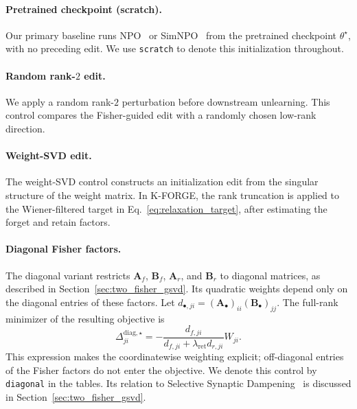 \documentclass[11pt]{article}
\begin{document}
\paragraph{Pretrained checkpoint (scratch).}
Our primary baseline runs NPO~\citep{npo} or SimNPO~\citep{simnpo} from the pretrained checkpoint $\theta^\star$, with no preceding edit.
We use \texttt{scratch} to denote this initialization throughout.

\paragraph{Random rank-$2$ edit.}
We apply a random rank-$2$ perturbation before downstream unlearning.
This control compares the Fisher-guided edit with a randomly chosen low-rank direction.

\paragraph{Weight-SVD edit.}
The weight-SVD control constructs an initialization edit from the singular structure of the weight matrix.
In K-FORGE, the rank truncation is applied to the Wiener-filtered target in Eq.~\ref{eq:relaxation_target}, after estimating the forget and retain factors.

\paragraph{Diagonal Fisher factors.}
The diagonal variant restricts $\mathbf{A}_f$, $\mathbf{B}_f$, $\mathbf{A}_r$, and $\mathbf{B}_r$ to diagonal matrices, as described in Section~\ref{sec:two_fisher_gsvd}.
Its quadratic weights depend only on the diagonal entries of these factors.
Let
$d_{\bullet,ji}=(\mathbf{A}_{\bullet})_{ii}(\mathbf{B}_{\bullet})_{jj}$.
The full-rank minimizer of the resulting objective is
\begin{equation}
    \Delta^{\mathrm{diag},\star}_{ji}
    = -\frac{d_{f,ji}}
    {d_{f,ji}+\lambda_{\mathrm{ret}}d_{r,ji}}W_{ji}.
    \label{eq:diagonal_fullrank}
\end{equation}
This expression makes the coordinatewise weighting explicit; off-diagonal entries of the Fisher factors do not enter the objective.
We denote this control by \texttt{diagonal} in the tables.
Its relation to Selective Synaptic Dampening~\citep{foster24} is discussed in Section~\ref{sec:two_fisher_gsvd}.
\end{document}
